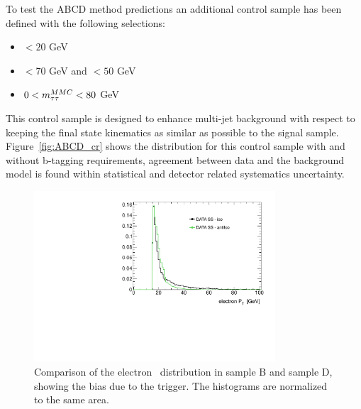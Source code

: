 To test the ABCD method predictions an additional control sample has been defined with the following selections:
\begin{itemize}
\item \MET $< 20$ GeV
\item \Ht $< 70$ GeV and \SumLtMET$ < 50$ GeV
\item $0 < m_{\tau\tau}^{MMC} < 80$ GeV  	 
\end{itemize}
This control sample is designed to enhance multi-jet background with respect to \Ztautau keeping the final 
state kinematics as similar as possible to the signal sample.
Figure~\ref{fig:ABCD_cr} shows the \mmc distribution for this control sample with and without b-tagging requirements, 
agreement between data and the background model is found within statistical and detector related systematics uncertainty. 

\begin{figure}[tp]
	\begin{center}
	\includegraphics[width=9cm]{figure/ABCD_regionB_Vs_regionD}
	\end{center}
	\caption{Comparison of the electron \pt~distribution in sample B and sample D, showing the bias due to the trigger. 
	The histograms are normalized to the same area.}
	\label{fig:BvsD}
\end{figure}



